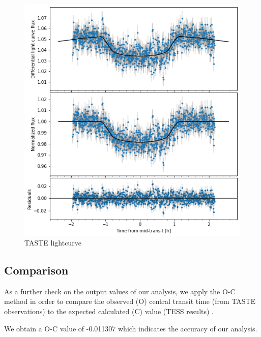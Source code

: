 \documentclass[a4paper,11pt,twocolumn]{article}
\begin{document}
\begin{figure}
    \centering
    \includegraphics[scale=0.4, angle=0]{../pictures/taste/lctaste.png}
    \caption{TASTE lightcurve}
   \label{fig: lc2}
\end{figure}



\clearpage
\subsection{Comparison}

As a further check on the output values of our analysis, we apply 
the O-C method in order to compare the observed (O)
central transit time (from TASTE observations) to the expected calculated (C) value (TESS results) .

We obtain a O-C value of -0.011307 which indicates the accuracy of our analysis.
\end{document}
